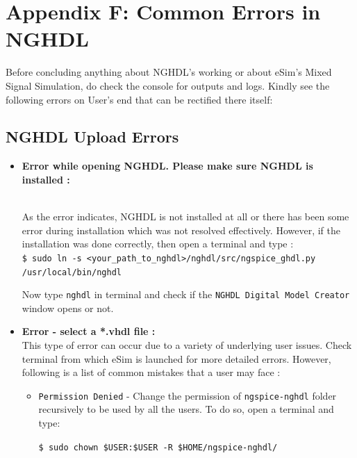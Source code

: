 \pagebreak 

\section {Appendix F: Common Errors in NGHDL}

Before concluding anything about NGHDL’s working or about eSim’s Mixed Signal Simulation, do check the console for outputs and logs. Kindly see the following errors on User’s end that can be rectified there itself:

\subsection{NGHDL Upload Errors}

\begin{itemize}
    \item \textbf{Error while opening NGHDL. Please make sure NGHDL is installed :}

 \\
As the error indicates, NGHDL is not installed at all or there has been some error during installation which was not resolved effectively. However, if the installation was done correctly, then open a terminal and type : \\

\noindent \texttt{\$ sudo ln -s <your\_path\_to\_nghdl>/nghdl/src/ngspice\_ghdl.py /usr/loc\linebreak     al/bin/nghdl}


Now type  \texttt{nghdl} in terminal and check if the \texttt{NGHDL Digital Model Creator} window opens or not.

\item \textbf{Error - select a *.vhdl file :} \\
This type of error can occur due to a variety of underlying user issues. Check terminal from which eSim is launched for more detailed errors. However, following is a list of common mistakes that a user may face : 
\begin{itemize}
    \item \texttt{Permission Denied} - Change the permission of \texttt{ngspice-nghdl} folder 
recursively to be used by all the users. To do so, open a terminal and type:
\begin{center}
    \texttt{\$ sudo chown \$USER:\$USER -R \$HOME/ngspice-nghdl/}
\end{center} 

\end{itemize}


\end{itemize}
